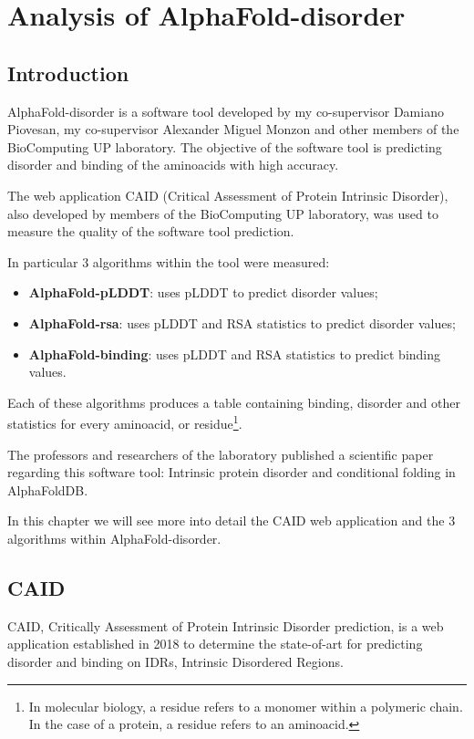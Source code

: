 \chapter{Analysis of AlphaFold-disorder}
\label{chp:alphafold-disorder}

\section{Introduction}
AlphaFold-disorder is a software tool developed by my co-supervisor Damiano Piovesan, my co-supervisor Alexander Miguel Monzon and other members of the BioComputing UP laboratory. The objective of the software tool is predicting disorder and binding of the aminoacids with high accuracy. 

The web application CAID (Critical Assessment of Protein Intrinsic Disorder), also developed by members of the BioComputing UP laboratory,  was used to measure the quality of the software tool prediction.

In particular 3 algorithms within the tool were measured: 
\begin{itemize}
    \item \textbf{AlphaFold-pLDDT}: uses pLDDT to predict disorder values;
    \item \textbf{AlphaFold-rsa}: uses pLDDT and RSA statistics to predict disorder values;
    \item \textbf{AlphaFold-binding}: uses pLDDT and RSA statistics to predict binding values.
\end{itemize}

Each of these algorithms produces a table containing binding, disorder and other statistics for every aminoacid, or residue\footnote{In molecular biology, a residue refers to a monomer within a polymeric chain. In the case of a protein, a residue refers to an aminoacid.}. 

The professors and researchers of the laboratory published a scientific paper\cite{alphafold-disorder} regarding this software tool: Intrinsic protein disorder and conditional folding in AlphaFoldDB. 

In this chapter we will see more into detail the CAID web application and the 3 algorithms within AlphaFold-disorder.

\section{CAID}
CAID, Critically Assessment of Protein Intrinsic Disorder prediction, is a web application established in 2018 to determine the state-of-art for predicting disorder and binding on IDRs, Intrinsic Disordered Regions. 


